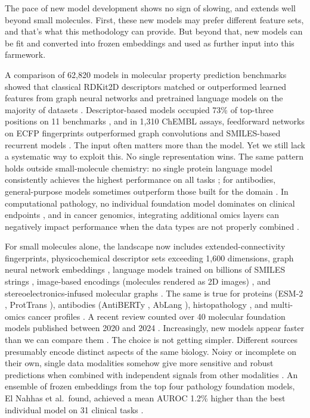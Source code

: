 The pace of new model development shows no sign of slowing, and extends well beyond small molecules. First, these new models may prefer different feature sets, and that's what this methodology can provide. But beyond that, new models can be fit and converted into frozen embeddings and used as further input into this farmework. 

A comparison of 62,820 models in molecular property prediction benchmarks showed that classical RDKit2D descriptors matched or outperformed learned features from graph neural networks and pretrained language models on the majority of datasets \citep{Deng2023}. Descriptor-based models occupied 73\% of top-three positions on 11 benchmarks \citep{Jiang2021}, and in 1,310 ChEMBL assays, feedforward networks on ECFP fingerprints outperformed graph convolutions and SMILES-based recurrent models \citep{Mayr2018}. The input often matters more than the model. Yet we still lack a systematic way to exploit this. No single representation wins. The same pattern holds outside small-molecule chemistry: no single protein language model consistently achieves the highest performance on all tasks \citep{Kenlay2024, Schmirler2024}; for antibodies, general-purpose models sometimes outperform those built for the domain \citep{Kenlay2024}. In computational pathology, no individual foundation model dominates on clinical endpoints \citep{ElNahhas2025}, and in cancer genomics, integrating additional omics layers can negatively impact performance when the data types are not properly combined \citep{Steyaert2023}.

For small molecules alone, the landscape now includes extended-connectivity fingerprints, physicochemical descriptor sets exceeding 1,600 dimensions, graph neural network embeddings \citep{Yang2019, Fang2022}, language models trained on billions of SMILES strings \citep{ross2022}, image-based encodings (molecules rendered as 2D images) \citep{Zeng2022}, and stereoelectronics-infused molecular graphs \citep{Boiko2025}. The same is true for proteins (ESM-2 \citep{Lin2023}, ProtTrans \citep{Elnaggar2022}), antibodies (AntiBERTy \citep{Ruffolo2021}, AbLang \citep{Olsen2022}), histopathology \citep{ElNahhas2025}, and multi-omics cancer profiles \citep{Steyaert2023}. A recent review counted over 40 molecular foundation models published between 2020 and 2024 \citep{Song2026}. Increasingly, new models appear faster than we can compare them \citep{Bommasani2021}. The choice is not getting simpler. Different sources presumably encode distinct aspects of the same biology. Noisy or incomplete on their own, single data modalities somehow give more sensitive and robust predictions when combined with independent signals from other modalities \citep{Steyaert2023}. An ensemble of frozen embeddings from the top four pathology foundation models, El Nahhas et al.\ found, achieved a mean AUROC 1.2\% higher than the best individual model on 31 clinical tasks \citep{ElNahhas2025}.

